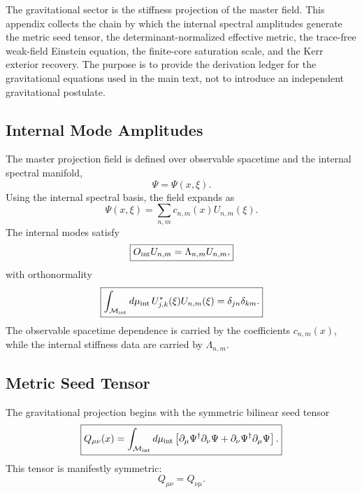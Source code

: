 \documentclass[11pt]{article}
\begin{document}
The gravitational sector is the stiffness projection of the master field. This
appendix collects the chain by which the internal spectral amplitudes generate
the metric seed tensor, the determinant-normalized effective metric, the
trace-free weak-field Einstein equation, the finite-core saturation scale, and
the Kerr exterior recovery. The purpose is to provide the derivation ledger for
the gravitational equations used in the main text, not to introduce an
independent gravitational postulate.

\subsection{Internal Mode Amplitudes}

The master projection field is defined over observable spacetime and the
internal spectral manifold,
\begin{equation}
\Psi=\Psi(x,\xi).
\end{equation}
Using the internal spectral basis, the field expands as
\begin{equation}
\boxed{
\Psi(x,\xi)
=
\sum_{n,m}
c_{n,m}(x)U_{n,m}(\xi).
}
\end{equation}
The internal modes satisfy
\begin{equation}
\boxed{
O_{\rm int}U_{n,m}
=
\Lambda_{n,m}U_{n,m},
}
\end{equation}
with orthonormality
\begin{equation}
\boxed{
\int_{\mathcal M_{\rm int}}
d\mu_{\rm int}\,
U_{j,k}^{*}(\xi)U_{n,m}(\xi)
=
\delta_{jn}\delta_{km}.
}
\end{equation}
The observable spacetime dependence is carried by the coefficients
\(c_{n,m}(x)\), while the internal stiffness data are carried by
\(\Lambda_{n,m}\).

\subsection{Metric Seed Tensor}

The gravitational projection begins with the symmetric bilinear seed tensor
\begin{equation}
\boxed{
Q_{\mu\nu}(x)
=
\int_{\mathcal M_{\rm int}}
d\mu_{\rm int}
\left[
\partial_\mu\Psi^\dagger
\partial_\nu\Psi
+
\partial_\nu\Psi^\dagger
\partial_\mu\Psi
\right].
}
\end{equation}
This tensor is manifestly symmetric:
\begin{equation}
\boxed{
Q_{\mu\nu}=Q_{\nu\mu}.
}
\end{equation}
\end{document}
